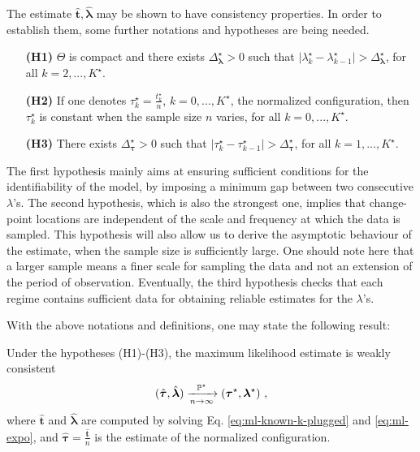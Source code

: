 The estimate $\hat{\bm t}, \hat{\bm \lambda}$ may be shown to have consistency properties. In order to establish them, some further notations and hypotheses are being needed. 
\begin{itemize}
\item[\textbf{(H1)}] $\Theta$ is compact and there exists $\Delta_{\bm \lambda}^{\star}>0$ such that $\vert \lambda_{k}^{\star}-\lambda_{k-1}^{\star}\vert > \Delta_{\bm \lambda}^{\star}$, for all $k=2,...,K^{\star}$. 
\item[\textbf{(H2)}] If one denotes $\tau^\star_k = \frac{t^\star_{k}}{n}$, $k=0,...,K^{\star}$, the normalized configuration, then $\tau^\star_k$ is constant when the sample size $n$ varies, for all $k=0,...,K^{\star}$. 
\item[\textbf{(H3)}]  There exists $\Delta_{\bm \tau}^{\star}>0$ such that $\vert \tau_{k}^{\star}-\tau_{k-1}^{\star}\vert > \Delta_{\bm \tau}^{\star}$, for all $k=1,...,K^{\star}$.
\end{itemize}

The first hypothesis mainly aims at ensuring sufficient conditions for the identifiability of the model, by imposing a minimum gap between two consecutive $\lambda$'s. The second hypothesis, which is also the strongest one, implies that change-point locations are independent of the scale and frequency at which the data is sampled. This hypothesis will also allow us to derive the asymptotic behaviour of the estimate, when the sample size is sufficiently large. One should note here that a larger sample means a finer scale for sampling the data and not an extension of the period of observation. Eventually, the third hypothesis checks that each regime contains sufficient data for obtaining reliable estimates for the $\lambda$'s. 

With the above notations and definitions, one may state the following result:

\begin{proposition}
Under the hypotheses (H1)-(H3), the maximum likelihood estimate is weakly consistent
\begin{equation}\label{eq:ml-convergence}
  (\hat{\bm \tau}, \hat{\bm \lambda}) \xrightarrow[n\rightarrow \infty]{\PP^{\star}}   (\bm \tau^{\star}, \bm \lambda^{\star}) \ ,
\end{equation}
where  $\hat{\bm t}$ and $\hat{\bm \lambda}$ are computed by solving Eq. \ref{eq:ml-known-k-plugged} and \ref{eq:ml-expo}, and $\hat{\bm \tau}= \frac{\hat{\bm t}}{n}$ is the estimate of the normalized configuration.
\end{proposition}

